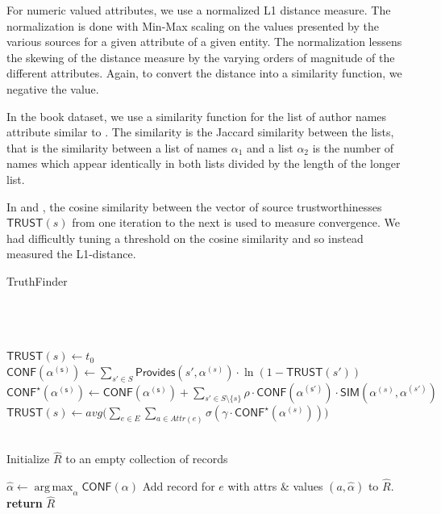 \documentclass{acm_proc_article-sp}
\DeclareMathOperator*{\argmax}{arg\,max}
\begin{document}
For numeric valued attributes, we use a normalized L1 distance measure. The normalization is done with Min-Max scaling on the values presented by the various sources for a given attribute of a given entity. The normalization lessens the skewing of the distance measure by the varying orders of magnitude of the different attributes. Again, to convert the distance into a similarity function, we negative the value. 

In the book dataset, we use a similarity function for the list of author names  attribute similar to \cite{dong:integrating}. The similarity is the Jaccard similarity between the lists, that is  the similarity between a list of names $\alpha_1$ and a list $\alpha_2$  is the number of names which appear identically in both lists divided by the length of the longer list. 

In \cite{yin:truth} and \cite{waguih:truth}, the cosine similarity between the vector of source trustworthinesses $\mathsf{TRUST}(s)$ from one iteration to the next is used to measure convergence. We had difficultly tuning a threshold on the cosine similarity and so instead measured the L1-distance. 

\begin{algorithm}
\caption{TruthFinder}
\begin{algorithmic}[1]
\small
{} \\
 \\
 \\

\State $\mathsf{TRUST}(s) \leftarrow t_0$
\EndFor
\\
\State $\mathsf{CONF(\alpha^{(s)})} \leftarrow \sum_{s' \in S} \mathsf{Provides}(s',\alpha^{(s)}) \cdot \ln(1-\mathsf{TRUST}(s'))$
\EndFor
{}
\State $\mathsf{CONF^\star(\alpha^{(s)})} \leftarrow \mathsf{CONF(\alpha^{(s)})} +   \sum_{s' \in S \setminus \{s\}} \rho \cdot \mathsf{CONF(\alpha^{(s')})}  \cdot \mathsf{SIM}(\alpha^{(s)},\alpha^{(s')})$
\EndFor
\EndFor
{}
\State $\mathsf{TRUST}(s) \leftarrow avg \big ( \sum_{e \in E}\sum_{a \in Attr(e)} \sigma(\gamma \cdot \mathsf{CONF}^\star(\alpha^{(s)})) \big )$
\EndFor
\EndWhile

\\
\State Initialize $\hat{R}$ to an empty collection of records

\State $\hat{\alpha} \leftarrow \argmax_{\alpha} \mathsf{CONF}(\alpha)$
\EndFor
\State Add record for $e$ with attrs \& values $(a, \hat{\alpha})$ to $\hat{R}$.
\EndFor
\\

\State \textbf{return} $\hat{R}$
\EndFunction
\end{algorithmic}
\label{alg:tf}
\end{algorithm}  
\end{document}
